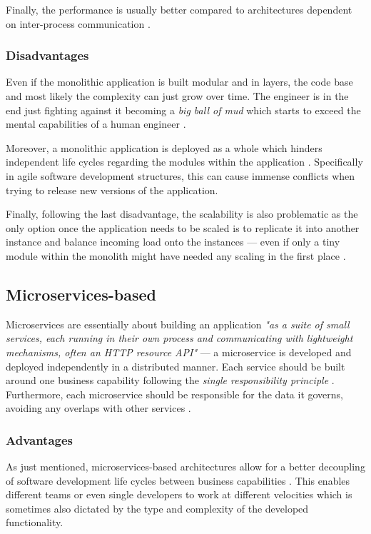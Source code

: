 \documentclass[12pt,a4paper]{report}
\begin{document}
Finally, the performance is usually better compared to architectures dependent
on inter-process communication \cite{knoche2016sustaining}.


\subsubsection{Disadvantages}
Even if the monolithic application is built modular and in layers,
the code base and most likely the complexity can just grow over time.
The engineer is in the end just fighting against it becoming a
\textit{big ball of mud} which starts to exceed the mental capabilities of a
human engineer \cite{newman2015building, foote1997bigballofmud, france2007model}.

Moreover, a monolithic application is deployed as a whole which hinders
independent life cycles regarding the modules within the application \cite{ms-fowler}.
Specifically in agile software development structures, this can cause immense
conflicts when trying to release new versions of the application.

Finally, following the last disadvantage, the scalability is also problematic
as the only option once the application needs to be scaled is to replicate it
into another instance and balance incoming load onto the instances ---
even if only a tiny module within the monolith might have needed any scaling
in the first place \cite{ms-fowler, newman2015building}.


\subsection{Microservices\hyp based}

Microservices are essentially about building an application
\textit{"as a suite of small services, each running in their own process and
communicating with lightweight mechanisms, often an HTTP resource API"}
\cite{ms-fowler} --- a microservice is developed and deployed independently
in a distributed manner.
Each service should be built around one business capability following the
\textit{single responsibility principle} \cite{newman2015building, martin2003agile}.
Furthermore, each microservice should be responsible for the data it governs,
avoiding any overlaps with other services \cite{ms-fowler}.


\subsubsection{Advantages}
As just mentioned, microservices\hyp based architectures allow for a better
decoupling of software development life cycles between business capabilities \cite{ms-fowler}.
This enables different teams or even single developers to work at different
velocities which is sometimes also dictated by the type and complexity of the
developed functionality.
\end{document}
